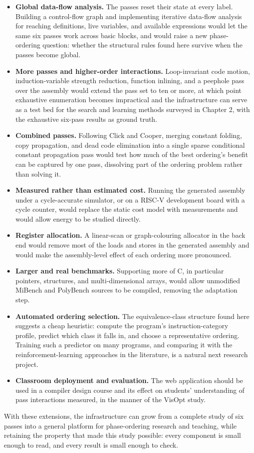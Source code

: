 \begin{itemize}
  \item \textbf{Global data-flow analysis.} The passes reset their state at every label. Building a control-flow graph and implementing iterative data-flow analysis for reaching definitions, live variables, and available expressions would let the same six passes work across basic blocks, and would raise a new phase-ordering question: whether the structural rules found here survive when the passes become global.
  \item \textbf{More passes and higher-order interactions.} Loop-invariant code motion, induction-variable strength reduction, function inlining, and a peephole pass over the assembly would extend the pass set to ten or more, at which point exhaustive enumeration becomes impractical and the infrastructure can serve as a test bed for the search and learning methods surveyed in Chapter 2, with the exhaustive six-pass results as ground truth.
  \item \textbf{Combined passes.} Following Click and Cooper, merging constant folding, copy propagation, and dead code elimination into a single sparse conditional constant propagation pass would test how much of the best ordering's benefit can be captured by one pass, dissolving part of the ordering problem rather than solving it.
  \item \textbf{Measured rather than estimated cost.} Running the generated assembly under a cycle-accurate simulator, or on a RISC-V development board with a cycle counter, would replace the static cost model with measurements and would allow energy to be studied directly.
  \item \textbf{Register allocation.} A linear-scan or graph-colouring allocator in the back end would remove most of the loads and stores in the generated assembly and would make the assembly-level effect of each ordering more pronounced.
  \item \textbf{Larger and real benchmarks.} Supporting more of C, in particular pointers, structures, and multi-dimensional arrays, would allow unmodified MiBench and PolyBench sources to be compiled, removing the adaptation step.
  \item \textbf{Automated ordering selection.} The equivalence-class structure found here suggests a cheap heuristic: compute the program's instruction-category profile, predict which class it falls in, and choose a representative ordering. Training such a predictor on many programs, and comparing it with the reinforcement-learning approaches in the literature, is a natural next research project.
  \item \textbf{Classroom deployment and evaluation.} The web application should be used in a compiler design course and its effect on students' understanding of pass interactions measured, in the manner of the VisOpt study.
\end{itemize}

With these extensions, the infrastructure can grow from a complete study of six passes into a general platform for phase-ordering research and teaching, while retaining the property that made this study possible: every component is small enough to read, and every result is small enough to check.
